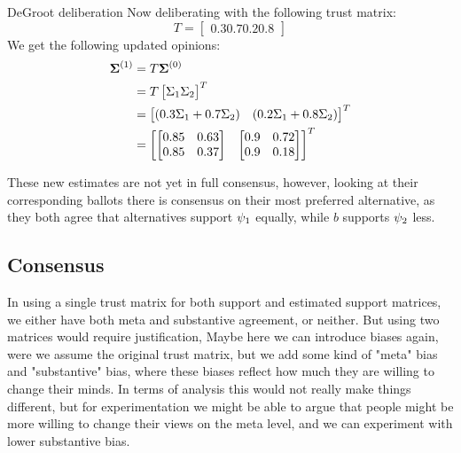 \begin{example}{DeGroot deliberation}
	Now deliberating with the following trust matrix:
	\[
		T=\begin{bmatrix}
			0.3	0.7
			0.2	0.8
		\end{bmatrix}
	\]
	We get the following updated opinions:
	\begin{align*}
		\boldsymbol{\boldsymbol{\Sigma}}^{(1)} & = T\boldsymbol{\boldsymbol{\Sigma}}^{(0)}                                                                     \\
		                                            & =T\begin{bmatrix}\Sigma_1 \Sigma_2\end{bmatrix}^{T}                                                      \\
		                                            & =\begin{bmatrix}(0.3\Sigma_1 + 0.7\Sigma_{2}) & (0.2\Sigma_1 + 0.8\Sigma_{2})\end{bmatrix}^{T} \\
		                                            & = \begin{bmatrix}
			                                                \begin{bmatrix}
				0.85 & 0.63 \\
				0.85 & 0.37 \\
			\end{bmatrix} &
			                                                \begin{bmatrix}
				0.9 & 0.72 \\
				0.9 & 0.18 \\
			\end{bmatrix}
		                                                \end{bmatrix}^{T}
	\end{align*}

	These new estimates are not yet in full consensus, however, looking at their corresponding ballots there is consensus on their most preferred alternative, as they both agree that alternatives support $\psi_1$ equally, while $b$ supports $\psi_2$ less.

	\label{example:deGroot-delib}
\end{example}

\subsection{Consensus}
\label{sub: concensus DeGroot}
\textcolor{RedViolet}{In using a single trust matrix for both support and estimated support matrices, we either have both meta and substantive agreement, or neither. But using two matrices would require justification, Maybe here we can introduce biases again, were we assume the original trust matrix, but we add some kind of "meta" bias and "substantive" bias, where these biases reflect how much they are willing to change their minds. In terms of analysis this would not really make things different, but for experimentation we might be able to argue that people might be more willing to change their views on the meta level, and we can experiment with lower substantive bias.}


